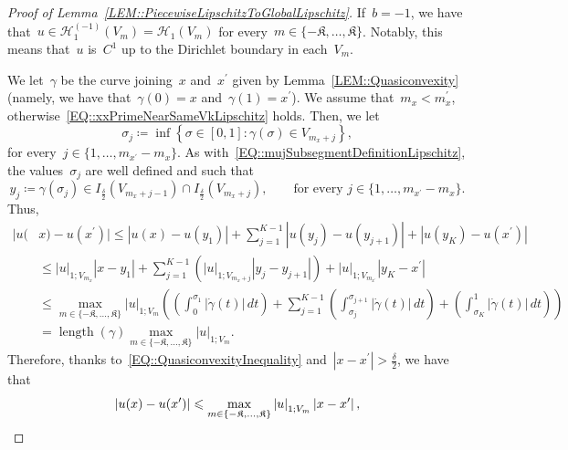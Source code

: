 \documentclass[12pt,a4paper]{amsart}
\makeatletter
\numberwithin{equation}{section}
\theoremstyle{definition}
\theoremstyle{remark}
\newcommand{\abs}[1]{\left\lvert#1\right\rvert}
\renewcommand{\leq}{\leqslant}
\newcommand{\constapp}[1]{%
  \csname constapp@#1\endcsname%
}
\makeatother
\begin{document}
\begin{appendix}
\begin{proof}[Proof of Lemma~\ref{LEM::PiecewiseLipschitzToGlobalLipschitz}]
    If~$b=-1$, we have that~$u \in \mathcal{H}_{1}^{(-1)}(V_m) = \mathcal{H}_{1}(V_m)$ for every~$m \in \{-\mathfrak{K},\dots,\mathfrak{K}\}$. Notably, this means that~$u$ is~$C^1$ up to the Dirichlet boundary in each~$V_m$. %

    We let~$\gamma$ be the curve joining~$x$ and~$x^\prime$ given by Lemma~\ref{LEM::Quasiconvexity} (namely, we have that~$\gamma(0) = x$ and~$\gamma(1) = x^\prime$). We assume that~$m_x < m_x^\prime$, otherwise~\eqref{EQ::xxPrimeNearSameVkLipschitz} holds. Then, we let
    \begin{equation}
        \sigma_j \coloneq \inf\left\{ \sigma \in [0,1] \colon \gamma(\sigma) \in V_{m_x+j} \right\},
    \end{equation}
    for every~$j \in \{1,\dots,m_{x^\prime}-m_x\}$. As with~\eqref{EQ::mujSubsegmentDefinitionLipschitz}, the values~$\sigma_j$ are well defined and such that
    \begin{equation}
        y_j \coloneq \gamma(\sigma_j)\in I_{\frac{\delta}{2}}(V_{m_x + j - 1})\cap I_{\frac{\delta}{2}}(V_{m_x + j}),\qquad \text{for every }j \in \{1,\dots,m_{x^\prime}-m_x\}.
    \end{equation}
    Thus,
    \begin{equation}
        \begin{split}
        |u(&x)-u(x^\prime)|\leq \abs{u(x)-u(y_1)} + \sum_{j=1}^{K-1} \abs{u(y_j)-u(y_{j+1})} + \abs{u(y_K)-u(x^\prime)}\\
            &\leq \abs{u}_{1; V_{m_x}} \abs{x-y_1} + \sum_{j=1}^{K-1} \left( \abs{u}_{1; V_{m_x+j}} \abs{y_j-y_{j+1}}\right) +\abs{u}_{1; V_{m_{x^\prime}}} \abs{y_K - x^\prime}\\
            &\leq \max_{m \in \{-\mathfrak{K},\dots,\mathfrak{K}\}} \abs{u}_{1; V_{m}} \left( {\left(\int_0^{\sigma_1}\abs{\dot{\gamma}(t)}\,dt\right)}+ \sum_{j=1}^{K-1} {\left(\int_{\sigma_j}^{\sigma_{j+1}}\abs{\dot{\gamma}(t)}\,dt\right)} + {\left(\int_{\sigma_K}^{1}\abs{\dot{\gamma}(t)}\,dt\right)}\right)\\
            & = \operatorname{length}(\gamma) \max_{m \in \{-\mathfrak{K},\dots,\mathfrak{K}\}} \abs{u}_{1; V_{m}}.
        \end{split}
    \end{equation}
    Therefore, thanks to~\eqref{EQ::QuasiconvexityInequality} and~$\abs{x-x^\prime} > \frac{\delta}{2}$, we have that
    \begin{equation}\label{OLD::EQ::xxprimeFarNegativeB}
        |u(x)-u(x^\prime)| \leq \constapp{CONST::Quasiconvexity} \max_{m \in \{-\mathfrak{K},\dots,\mathfrak{K}\}}\abs{u}_{1; V_{m}}\abs{x-x^\prime},

\end{equation}
\end{proof}
\end{appendix}
\end{document}
